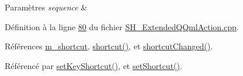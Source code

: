 \begin{DoxyParams}{Paramètres}
{\em sequence} & \\
\hline
\end{DoxyParams}


Définition à la ligne \hyperlink{SH__ExtendedQQmlAction_8cpp_source_l00080}{80} du fichier \hyperlink{SH__ExtendedQQmlAction_8cpp_source}{S\-H\-\_\-\-Extended\-Q\-Qml\-Action.\-cpp}.



Références \hyperlink{classSimpleHotel_1_1SH__ExtendedQQmlAction_a5522e6467ee3d0a8b7dc22a70497564c}{m\-\_\-shortcut}, \hyperlink{classSimpleHotel_1_1SH__ExtendedQQmlAction_a63684513c98d925803e42b153a1d5c34}{shortcut()}, et \hyperlink{classSimpleHotel_1_1SH__ExtendedQQmlAction_a2ff1f2e46d9617b3691287288ab9f265}{shortcut\-Changed()}.



Référencé par \hyperlink{classSimpleHotel_1_1SH__ExtendedQQmlAction_a4e55c5b5882454b1a2ae03561da99aa2}{set\-Key\-Shortcut()}, et \hyperlink{classSimpleHotel_1_1SH__ExtendedQQmlAction_a72ce84e2fb997fb4b9dc70f5d6f17237}{set\-Shortcut()}.


